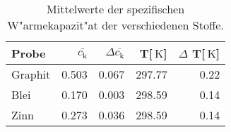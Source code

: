 
\begin{table}[!h]
\begin{center}
\begin{tabular}{|l|r|r|r|r|}
\hline
Probe & $\bar{c_\mathrm{k}}$ & $\Delta\overline{c_\mathrm{k}}$ & T[$\SI{}{\kelvin}$] & $\Delta$ T[$\SI{}{\kelvin}$] \\
\hline
\hline
Graphit & 0.503 & 0.067 & 297.77 & 0.22\\
Blei    & 0.170 & 0.003 & 298.59 & 0.14\\
Zinn    & 0.273 & 0.036 & 298.59 & 0.14\\
\hline
\end{tabular}
\caption[]{Mittelwerte der spezifischen W"armekapazit"at der verschiedenen Stoffe.}
\label{mittel}
\end{center}
\end{table}